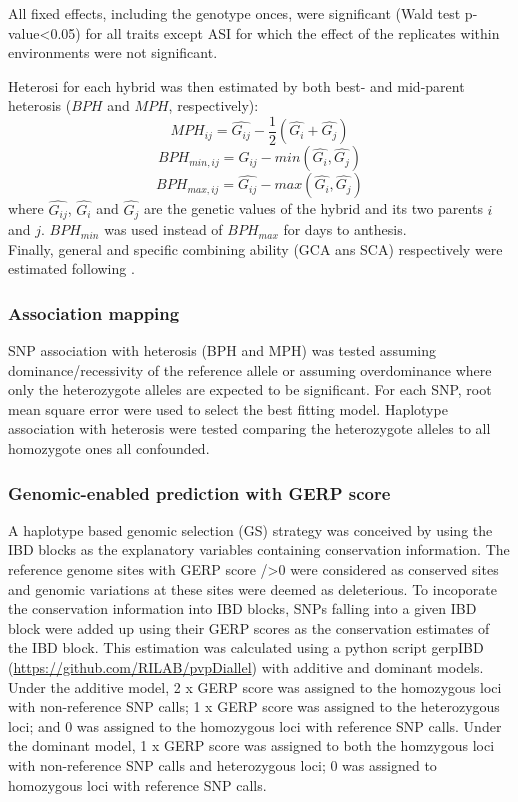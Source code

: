\documentclass[10pt]{article}
\begin{document}
All fixed effects, including the genotype onces, were significant (Wald test p-value<0.05) for all traits except ASI for which the effect of the replicates within environments were not significant.

Heterosi for each hybrid was then estimated by both best- and mid-parent heterosis ($BPH$ and $MPH$, respectively):
%
\[ MPH_{ij}=\hat{G_{ij}}-\frac{1}{2}(\hat{G_{i}}+\hat{G_{j}}) \]
\[ BPH_{min,ij}=\hat{G_{ij}}-min(\hat{G_{i}} ,\hat{G_{j}}) \] 
\[ BPH_{max,ij}=\hat{G_{ij}}-max(\hat{G_{i}} ,\hat{G_{j}}) \]
%
where $\hat{G_{ij}}$, $\hat{G_{i}}$ and $\hat{G_{j}}$ are the genetic values of the hybrid and its two parents $i$ and $j$. $BPH_{min}$ was used instead of $BPH_{max}$ for days to anthesis.\\

Finally, general and specific combining ability (GCA ans SCA) respectively were estimated following \citet{Falconer1996}.

\subsubsection*{Association mapping}
SNP association with heterosis (BPH and MPH) was tested assuming dominance/recessivity of the reference allele or assuming overdominance where only the heterozygote alleles are expected to be significant. For each SNP, root mean square error were used to select the best fitting model. 
Haplotype association with heterosis were tested comparing the heterozygote alleles to all homozygote ones all confounded. 


\subsubsection*{Genomic-enabled prediction with GERP score}

A haplotype based genomic selection (GS) strategy was conceived by using the IBD blocks as the explanatory variables containing conservation information. The reference genome sites with GERP score />0 were considered as conserved sites and genomic variations at these sites were deemed as deleterious. To incoporate the conservation information into IBD blocks, SNPs falling into a given IBD block were added up using their GERP scores as the conservation estimates of the IBD block. This estimation was calculated using a python script gerpIBD (\url{https://github.com/RILAB/pvpDiallel}) with additive and dominant models. Under the additive model, 2 x GERP score was assigned to the homozygous loci with non-reference SNP calls; 1 x GERP score was assigned to the heterozygous loci; and 0 was assigned to the homozygous loci with reference SNP calls. Under the dominant model, 1 x GERP score was assigned to both the homzygous loci with non-reference SNP calls and heterozygous loci; 0 was assigned to homozygous loci with reference SNP calls.
\end{document}
